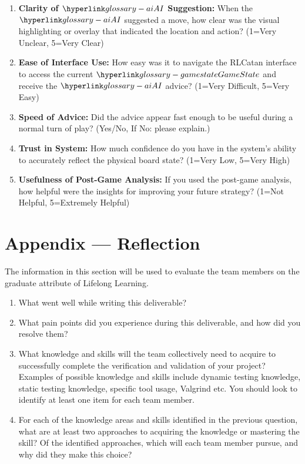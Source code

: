 \documentclass[12pt, titlepage]{article}
\begin{document}
\begin{enumerate}
    \item \textbf{Clarity of $\AI{}$ Suggestion:} When the $\AI{}$ suggested a move, how clear was the visual highlighting or overlay that indicated the location and action? (1=Very Unclear, 5=Very Clear)
    \item \textbf{Ease of Interface Use:} How easy was it to navigate the RLCatan interface to access the current $\GameState{}$ and receive the $\AI{}$ advice? (1=Very Difficult, 5=Very Easy)
    \item \textbf{Speed of Advice:} Did the advice appear fast enough to be useful during a normal turn of play? (Yes/No, If No: please explain.)
    \item \textbf{Trust in System:} How much confidence do you have in the system's ability to accurately reflect the physical board state? (1=Very Low, 5=Very High)
    \item \textbf{Usefulness of Post-Game Analysis:} If you used the post-game analysis, how helpful were the insights for improving your future strategy? (1=Not Helpful, 5=Extremely Helpful)
\end{enumerate}


\newpage{}
\section*{Appendix --- Reflection}


The information in this section will be used to evaluate the team members on the
graduate attribute of Lifelong Learning.



\begin{enumerate}
  \item What went well while writing this deliverable? 
  \item What pain points did you experience during this deliverable, and how
    did you resolve them?
  \item What knowledge and skills will the team collectively need to acquire to
  successfully complete the verification and validation of your project?
  Examples of possible knowledge and skills include dynamic testing knowledge,
  static testing knowledge, specific tool usage, Valgrind etc.  You should look to
  identify at least one item for each team member.
  \item For each of the knowledge areas and skills identified in the previous
  question, what are at least two approaches to acquiring the knowledge or
  mastering the skill?  Of the identified approaches, which will each team
  member pursue, and why did they make this choice?
\end{enumerate}
\end{document}
